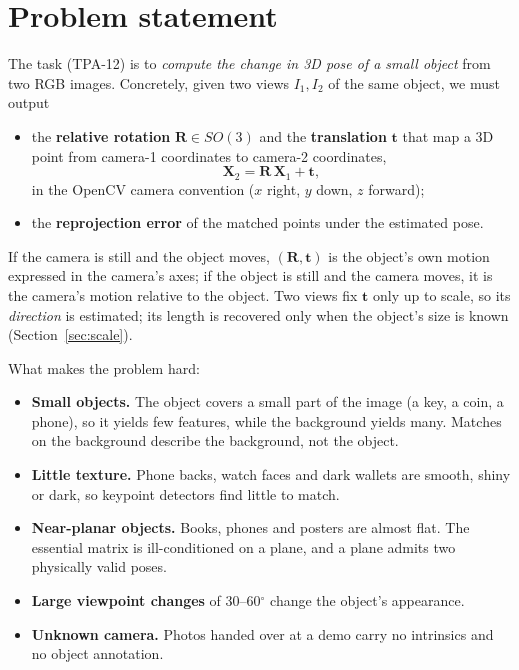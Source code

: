 \documentclass[11pt,a4paper]{article}
\newcommand{\R}{\mathbf{R}}
\newcommand{\tv}{\mathbf{t}}
\newcommand{\X}{\mathbf{X}}
\begin{document}
\tableofcontents
\newpage

\section{Problem statement}

The task (TPA-12) is to \emph{compute the change in 3D pose of a small object} from two RGB
images. Concretely, given two views $I_1, I_2$ of the same object, we must output
\begin{itemize}
  \item the \textbf{relative rotation} $\R \in SO(3)$ and the \textbf{translation} $\tv$ that map
        a 3D point from camera-1 coordinates to camera-2 coordinates,
        \begin{equation}
          \X_2 = \R\,\X_1 + \tv ,
        \end{equation}
        in the OpenCV camera convention ($x$ right, $y$ down, $z$ forward);
  \item the \textbf{reprojection error} of the matched points under the estimated pose.
\end{itemize}
If the camera is still and the object moves, $(\R,\tv)$ is the object's own motion expressed
in the camera's axes; if the object is still and the camera moves, it is the camera's motion
relative to the object. Two views fix $\tv$ only up to scale, so its \emph{direction} is
estimated; its length is recovered only when the object's size is known
(Section~\ref{sec:scale}).

What makes the problem hard:
\begin{itemize}
  \item \textbf{Small objects.} The object covers a small part of the image (a key, a coin, a
        phone), so it yields few features, while the background yields many. Matches on the
        background describe the background, not the object.
  \item \textbf{Little texture.} Phone backs, watch faces and dark wallets are smooth, shiny or
        dark, so keypoint detectors find little to match.
  \item \textbf{Near-planar objects.} Books, phones and posters are almost flat. The essential
        matrix is ill-conditioned on a plane, and a plane admits two physically valid poses.
  \item \textbf{Large viewpoint changes} of 30--60$^\circ$ change the object's appearance.
  \item \textbf{Unknown camera.} Photos handed over at a demo carry no intrinsics and no
        object annotation.
\end{itemize}
\end{document}

